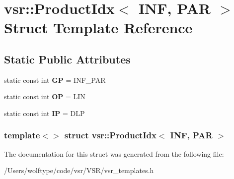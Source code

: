 \hypertarget{structvsr_1_1_product_idx_3_01_i_n_f_00_01_p_a_r_01_4}{\section{vsr\-:\-:Product\-Idx$<$ I\-N\-F, P\-A\-R $>$ Struct Template Reference}
\label{structvsr_1_1_product_idx_3_01_i_n_f_00_01_p_a_r_01_4}
}
\subsection*{Static Public Attributes}
\begin{DoxyCompactItemize}
\item 
\hypertarget{structvsr_1_1_product_idx_3_01_i_n_f_00_01_p_a_r_01_4_a0147cbf6b3f43a3452bce438c40d1f8e}{static const int {\bfseries G\-P} = I\-N\-F\-\_\-\-P\-A\-R}\label{structvsr_1_1_product_idx_3_01_i_n_f_00_01_p_a_r_01_4_a0147cbf6b3f43a3452bce438c40d1f8e}

\item 
\hypertarget{structvsr_1_1_product_idx_3_01_i_n_f_00_01_p_a_r_01_4_aa3304f1d80e4353b49fabf04d1b708e1}{static const int {\bfseries O\-P} = L\-I\-N}\label{structvsr_1_1_product_idx_3_01_i_n_f_00_01_p_a_r_01_4_aa3304f1d80e4353b49fabf04d1b708e1}

\item 
\hypertarget{structvsr_1_1_product_idx_3_01_i_n_f_00_01_p_a_r_01_4_a7c916b6d42d150212c793ca9e8d7ebba}{static const int {\bfseries I\-P} = D\-L\-P}\label{structvsr_1_1_product_idx_3_01_i_n_f_00_01_p_a_r_01_4_a7c916b6d42d150212c793ca9e8d7ebba}

\end{DoxyCompactItemize}
\subsubsection*{template$<$$>$ struct vsr\-::\-Product\-Idx$<$ I\-N\-F, P\-A\-R $>$}



The documentation for this struct was generated from the following file\-:\begin{DoxyCompactItemize}
\item 
/\-Users/wolftype/code/vsr/\-V\-S\-R/vsr\-\_\-templates.\-h\end{DoxyCompactItemize}
